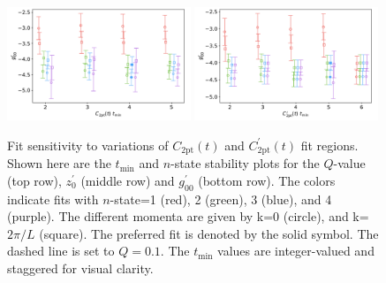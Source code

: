 \documentclass[prd,aps,twocolumn,superscriptaddress,tightenlines,nofootinbib,floatfix,preprintnumbers,10pt]{revtex4-1}
\begin{document}
\begin{figure}[h]
{		\includegraphics[width=0.49\textwidth]{plots/figures/2pt_dgV.pdf}
		\includegraphics[width=0.49\textwidth]{plots/figures/d2pt_dgV.pdf}
		\caption{Fit sensitivity to variations of $C_{\mathrm{2pt}}(t)$ and $C^\prime_{\mathrm{2pt}}(t)$ fit regions. Shown here are the $t_{\mathrm{min}}$ and $n$-state stability plots for the $Q$-value (top row), $z^\prime_0$ (middle row) and $g^\prime_{00}$ (bottom row). The colors indicate fits with $n$-state=1 (red), 2 (green), 3 (blue), and 4 (purple). The different momenta are given by k=0 (circle), and k=$2\pi/L$ (square). The preferred fit is denoted by the solid symbol. The dashed line is set to $Q=0.1$. The $t_{\mathrm{min}}$ values are integer-valued and staggered for visual clarity.}
		\label{fig:stability_c2pt}
}\end{figure}
\end{document}
